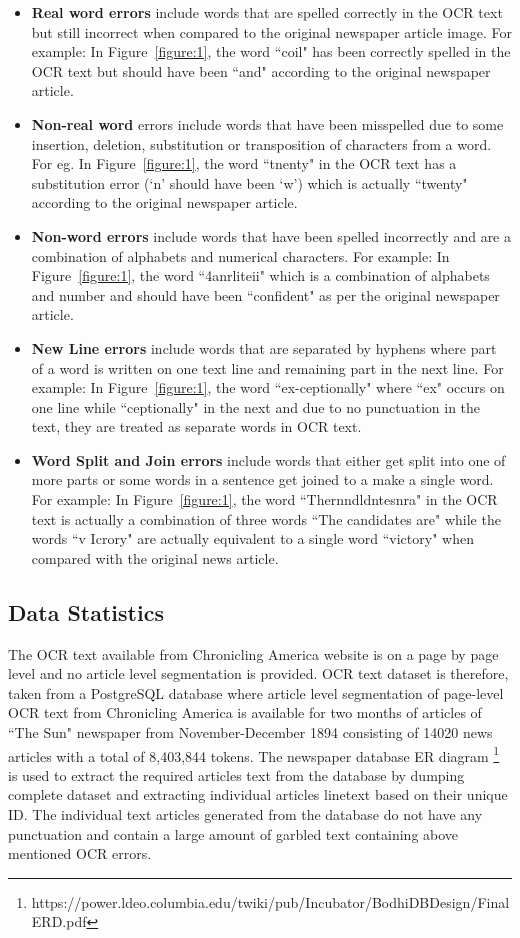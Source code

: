 \documentclass[10pt,journal,compsoc]{IEEEtran}
\begin{document}
\begin{itemize}
 \item \textbf{Real word errors}	 include words that are spelled correctly in the OCR text but still incorrect when compared to the original newspaper article image. For example: In Figure~\ref{figure:1}, the word ``coil"  has been correctly spelled in the OCR text  but should have been ``and" according to the original newspaper article. 
 \item \textbf{Non-real word} errors include words that have been misspelled due to some insertion, deletion, substitution or transposition of characters from a word. For eg. In Figure~\ref{figure:1}, the word ``tnenty" in the OCR text has a substitution error (`n' should have been `w') which is actually ``twenty" according to the original newspaper article.
 \item \textbf{Non-word errors} include words that have been spelled incorrectly and are a combination of alphabets and numerical characters. For example: In Figure~\ref{figure:1}, the word ``4anrliteii" which is a combination of alphabets and number and should have been ``confident" as per the original newspaper article.
\item \textbf{New Line errors} include words that are separated by hyphens where part of a word is written on one text line and remaining part in the next line. For example: In Figure~\ref{figure:1}, the word ``ex-ceptionally" where ``ex" occurs on one line while ``ceptionally" in the next and due to no punctuation in the text, they are treated as separate words in OCR text.
\item \textbf{Word Split and Join errors} include words that either get split into one of more parts or some words in a sentence get joined to a make a single word. For example: In Figure~\ref{figure:1}, the word ``Thernndldntesnra" in the OCR text is actually a combination of three words ``The candidates are" while the words ``v Icrory" are actually equivalent to a single word ``victory" when compared with the original news article.
\end{itemize} 

\subsection{Data Statistics}
The OCR text available from Chronicling America website is on a page by page level and no article level segmentation is provided. OCR text dataset is therefore, taken from a PostgreSQL database where article level segmentation of page-level OCR text from Chronicling America is available for two months of articles of ``The Sun" newspaper from November-December 1894 consisting of 14020 news articles with a total of 8,403,844 tokens. The newspaper database ER diagram \footnote{https://power.ldeo.columbia.edu/twiki/pub/Incubator/BodhiDBDesign/Final ERD.pdf }
is used to extract the required articles text from the database by dumping complete dataset and extracting individual articles linetext based on their unique ID. The individual text articles generated from the database do not have any punctuation and contain a large amount of garbled text containing above mentioned OCR errors.
\end{document}
